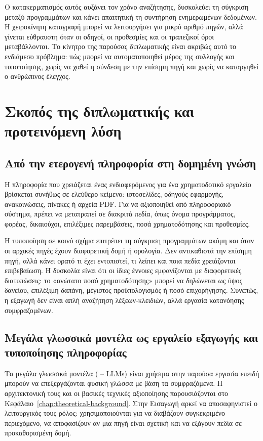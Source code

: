 Ο κατακερματισμός αυτός αυξάνει τον χρόνο αναζήτησης, δυσκολεύει τη σύγκριση
μεταξύ προγραμμάτων και κάνει απαιτητική τη συντήρηση ενημερωμένων δεδομένων.
Η χειροκίνητη καταγραφή μπορεί να λειτουργήσει για μικρό αριθμό πηγών, αλλά
γίνεται εύθραυστη όταν οι οδηγοί, οι προθεσμίες και οι τραπεζικοί όροι
μεταβάλλονται. Το κίνητρο της παρούσας διπλωματικής είναι ακριβώς αυτό το
ενδιάμεσο πρόβλημα: πώς μπορεί να αυτοματοποιηθεί μέρος της συλλογής και
τυποποίησης, χωρίς να χαθεί η σύνδεση με την επίσημη πηγή και χωρίς να
καταργηθεί ο ανθρώπινος έλεγχος.

\section{Σκοπός της διπλωματικής και προτεινόμενη λύση}

\subsection{Από την ετερογενή πληροφορία στη δομημένη γνώση}

Η πληροφορία που χρειάζεται ένας ενδιαφερόμενος για ένα χρηματοδοτικό εργαλείο
βρίσκεται συνήθως σε ελεύθερο κείμενο: ιστοσελίδες, οδηγούς εφαρμογής,
ανακοινώσεις, πίνακες ή αρχεία PDF. Για να αξιοποιηθεί από πληροφοριακό
σύστημα, πρέπει να μετατραπεί σε διακριτά πεδία, όπως όνομα προγράμματος,
φορέας, δικαιούχοι, επιλέξιμες παρεμβάσεις, ποσά χρηματοδότησης και
προθεσμίες.

Η τυποποίηση σε κοινό σχήμα επιτρέπει τη σύγκριση προγραμμάτων ακόμη και όταν
οι αρχικές πηγές έχουν διαφορετική δομή ή ορολογία. Δεν αντικαθιστά την
επίσημη πηγή, αλλά κάνει ορατό τι έχει εντοπιστεί, τι λείπει και ποια πεδία
χρειάζονται επιβεβαίωση. Η δυσκολία είναι ότι οι ίδιες έννοιες εμφανίζονται με
διαφορετικές διατυπώσεις: το «ανώτατο ποσό χρηματοδότησης» μπορεί να δηλώνεται
ως ύψος δανείου, επιλέξιμη δαπάνη, μέγιστος προϋπολογισμός ή ποσό
επιχορήγησης. Συνεπώς, η εξαγωγή δεν είναι απλή αναζήτηση λέξεων-κλειδιών, αλλά
εργασία κατανόησης συμφραζομένων.

\subsection{Μεγάλα γλωσσικά μοντέλα ως εργαλείο εξαγωγής και τυποποίησης πληροφορίας}

Τα μεγάλα γλωσσικά μοντέλα ( -- LLMs) είναι χρήσιμα
στην παρούσα εργασία επειδή μπορούν να επεξεργάζονται φυσική γλώσσα με βάση τα
συμφραζόμενα. Η αρχιτεκτονική τους και οι βασικές τεχνικές αξιοποίησης
παρουσιάζονται στο Κεφάλαιο~\ref{chap:theoretical-background}. Στην Εισαγωγή
αρκεί να αποσαφηνιστεί ο λειτουργικός τους ρόλος: χρησιμοποιούνται για να
διαβάζουν συγκεκριμένο περιεχόμενο, να αποφασίζουν αν μια πηγή είναι σχετική
και να εξάγουν πεδία σε προκαθορισμένη δομή.

